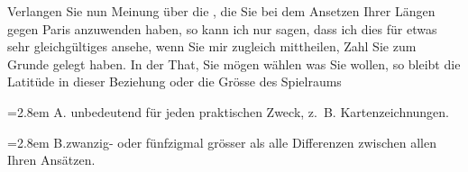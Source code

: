 \par\noindent\hspace*{\parindent}Verlangen Sie nun  Meinung über die , die Sie bei dem Ansetzen Ihrer Längen gegen Paris anzuwenden haben, so kann ich nur sagen, dass ich dies für etwas sehr gleichgültiges ansehe, wenn Sie mir zugleich mittheilen,  Zahl Sie zum Grunde gelegt haben. In der That, Sie mögen wählen was Sie wollen, so bleibt die Latitüde in dieser Beziehung oder die Grösse des Spielraums
\par\noindent\hspace*{\parindent}\hangindent=2.8em A.\quad {} unbedeutend für jeden praktischen Zweck, z.~B. Kartenzeichnungen.
\par\noindent\hspace*{\parindent}\hangindent=2.8em B.\quad zwanzig- oder fünfzigmal grösser als alle  Differenzen zwischen allen Ihren Ansätzen.

